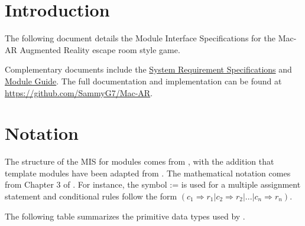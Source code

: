\documentclass[12pt, titlepage]{article}
\begin{document}
\newpage

\tableofcontents

\newpage


\section{Introduction}

The following document details the Module Interface Specifications for the Mac-AR Augmented Reality escape room style game.

Complementary documents include the \href{https://github.com/SammyG7/Mac-AR/blob/main/docs/SRS/SRS.pdf}{System Requirement Specifications}
and \href{https://github.com/SammyG7/Mac-AR/blob/main/docs/Design/SoftArchitecture/MG.pdf}{Module Guide}.  The full documentation and implementation can be
found at \url{https://github.com/SammyG7/Mac-AR}. 

\section{Notation}

The structure of the MIS for modules comes from \citet{HoffmanAndStrooper1995},
with the addition that template modules have been adapted from
\cite{GhezziEtAl2003}.  The mathematical notation comes from Chapter 3 of
\citet{HoffmanAndStrooper1995}.  For instance, the symbol := is used for a
multiple assignment statement and conditional rules follow the form $(c_1
\Rightarrow r_1 | c_2 \Rightarrow r_2 | ... | c_n \Rightarrow r_n )$.

The following table summarizes the primitive data types used by \progname. 
\end{document}

